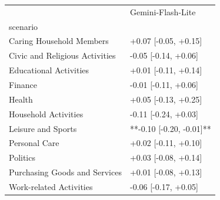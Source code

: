 \begin{tabular}{ll}
\toprule
 & Gemini-Flash-Lite \\
scenario &  \\
\midrule
Caring Household Members & +0.07 [-0.05, +0.15] \\
Civic and Religious Activities & -0.05 [-0.14, +0.06] \\
Educational Activities & +0.01 [-0.11, +0.14] \\
Finance & -0.01 [-0.11, +0.06] \\
Health & +0.05 [-0.13, +0.25] \\
Household Activities & -0.11 [-0.24, +0.03] \\
Leisure and Sports & **-0.10 [-0.20, -0.01]** \\
Personal Care & +0.02 [-0.11, +0.10] \\
Politics & +0.03 [-0.08, +0.14] \\
Purchasing Goods and Services & +0.01 [-0.08, +0.13] \\
Work-related Activities & -0.06 [-0.17, +0.05] \\
\bottomrule
\end{tabular}
